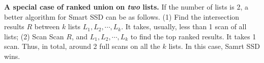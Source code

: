 \textbf{A special case of ranked union on \emph{two} lists.} If the number of lists is 2, a better algorithm for Smart SSD can be as follows. (1) Find the intersection results $R$ between $k$ lists $L_1, L_2, \cdots, L_k$. It takes, usually, less than 1 scan of all lists; (2) Scan Scan $R$, and $L_1, L_2, \cdots, L_k$ to find the top ranked results. It takes 1 scan. Thus, in total, around 2 full scans on all the $k$ lists. In this case, Samrt SSD wins. 
